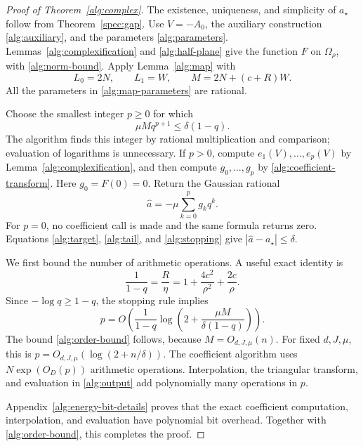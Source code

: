 \documentclass[reqno]{amsart}
\theoremstyle{definition}
\theoremstyle{remark}
\begin{document}
\begin{proof}[Proof of Theorem~\ref{alg:complex}]
The existence, uniqueness, and simplicity of \(a_\star\) follow
from Theorem~\ref{spec:gap}.
Use \(V=-A_0\), the auxiliary construction
\eqref{alg:auxiliary}, and the parameters
\eqref{alg:parameters}.
Lemmas~\ref{alg:complexification} and
\ref{alg:half-plane} give the function \(F\) on
\(\Omega_\rho\), with \eqref{alg:norm-bound}.
Apply Lemma~\ref{alg:map} with
\[
 L_0=2N,\qquad L_1=W,\qquad
 M=2N+(c+R)W.
 \]
All the parameters in \eqref{alg:map-parameters} are rational.

Choose the smallest integer \(p\ge0\) for which
\begin{equation}
 \mu M q^{p+1}\le\delta(1-q).
 \label{alg:stopping}
\end{equation}
The algorithm finds this integer by rational multiplication and
comparison; evaluation of logarithms is unnecessary.
If \(p>0\), compute \(e_1(V),\ldots,e_p(V)\) by
Lemma~\ref{alg:complexification}, and then compute
\(g_0,\ldots,g_p\) by
\eqref{alg:coefficient-transform}.
Here \(g_0=F(0)=0\).
Return the Gaussian rational
\begin{equation}
 \widehat a=-\mu\sum_{k=0}^p g_kq^k.
 \label{alg:output}
\end{equation}
For \(p=0\), no coefficient call is made and the same formula
returns zero.
Equations \eqref{alg:target}, \eqref{alg:tail}, and
\eqref{alg:stopping} give
\(|\widehat a-a_\star|\le\delta\).

We first bound the number of arithmetic operations.
A useful exact identity is
\begin{equation}
 \frac1{1-q}=\frac R\eta
     =1+\frac{4c^2}{\rho^2}+\frac{2c}{\rho}.
 \label{alg:contraction-parameter}
\end{equation}
Since \(-\log q\ge1-q\), the stopping rule implies
\[
 p=O\!\left(
   \frac1{1-q}
   \log\!\left(2+\frac{\mu M}{\delta(1-q)}\right)
 \right).
 \]
The bound \eqref{alg:order-bound} follows, because
\(M=O_{d,J,\mu}(n)\).
For fixed \(d,J,\mu\), this is
\(p=O_{d,J,\mu}(\log(2+n/\delta))\).
The coefficient algorithm uses
\(N\exp(O_D(p))\) arithmetic operations.
Interpolation, the triangular transform, and evaluation in
\eqref{alg:output} add polynomially many operations in \(p\).

Appendix~\ref{alg:energy-bit-details} proves that the exact coefficient
computation, interpolation, and evaluation have polynomial bit overhead.
Together with \eqref{alg:order-bound}, this completes the proof.
\end{proof}
\end{document}
